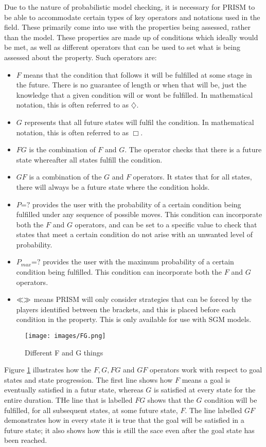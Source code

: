 \documentclass{l4proj}
\begin{document}
Due to the nature of probabilistic model checking, it is necessary for PRISM to be able to accommodate certain types of key operators and notations used in the field. These primarily come into use with the properties being assessed, rather than the model.
These properties are made up of conditions which ideally would be met, as well as different operators that can be used to set what is being assessed about the property. Such operators are:
\begin{itemize}
\item $F$ means that the condition that follows it will be fulfilled at some stage in the future. There is no guarantee of length or when that will be, just the knowledge that a given condition will or wont be fulfilled. In mathematical notation, this is often referred to as $\diamondsuit$.
\item $G$ represents that all future states will fulfil the condition. In mathematical notation, this is often referred to as $\Box$.
\item $FG$ is the combination of $F$ and $G$. The operator checks that there is a future state whereafter all states fulfill the condition.
\item $GF$ is a combination of the $G$ and $F$ operators. It states that for all states, there will always be a future state where the condition holds.
\item $P$=$?$ provides the user with the probability of a certain condition being fulfilled under any sequence of possible moves. This condition can incorporate both the $F$ and $G$ operators, and can be set to a specific value to check that states that meet a certain condition do not arise with an unwanted level of probability.
\item $P{_{max}}$=$?$ provides the user with the maximum probability of a certain condition being fulfilled. This condition can incorporate both the $F$ and $G$ operators. 
\item ${\tt \ll \gg}$ means PRISM will only consider strategies that can be forced by the players identified between the brackets, and this is placed before each condition in the property. This is only available for use with SGM models.
\end{itemize}

\begin{figure}[h!]
\centering
\texttt{[image: images/FG.png]}
\caption{Different F and G things}
\label{FG}
\end{figure}

Figure \ref{FG} illustrates how the $F, G, FG$ and $GF$ operators work with respect to goal states and state progression. The first line shows how $F$ means a goal is eventually satisfied in a futur state, whereas $G$ is satisfied at every state for the entire duration. THe line that is labelled $FG$ shows that the $G$ condition will be fulfilled, for all subsequent states, at some future state, $F$. The line labelled $GF$ demonstrates how in every state it is true that the goal will be satisfied in a future state; it also shows how this is still the sace even after the goal state has been reached.
\end{document}
